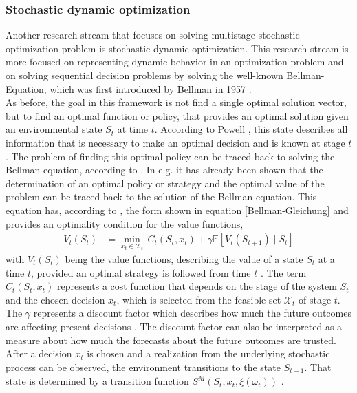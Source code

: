  \subsubsection{Stochastic dynamic optimization} \label{stochastic_dynamic_programming}
Another research stream that focuses on solving multistage stochastic optimization problem is stochastic dynamic optimization.
This research stream is more focused on representing dynamic behavior in an optimization problem and on solving sequential decision problems by solving the well-known Bellman-Equation, which was first introduced by Bellman in 1957 \cite{Bellman1957}. \\
As before, the goal in this framework is not find a single optimal solution vector, but to find an optimal function or policy, that provides an optimal solution given an environmental state $S_t$ at time $t$.
According to Powell \cite{Powell_solving_Curses_of_Dimensionality}, this state describes all information that is necessary to make an optimal decision and is known at stage $t$.
The problem of finding this optimal policy can be traced back to solving the Bellman equation, according to \cite{Einfuehrung_in_das_OR}.
In e.g. \cite{Einfuehrung_in_das_OR} it has already been shown that the determination of an optimal policy or strategy and the optimal value of the problem can be traced back to the solution of the Bellman equation.
This equation has, according to \cite{Powell_solving_Curses_of_Dimensionality}, the form shown in equation \ref{Bellman-Gleichung} and provides an optimality condition for the value functions,
\begin{align}\label{Bellman-Gleichung}
       V_{t}(S_{t})& = \underset{x_{t}\in{\mathcal{X}_{t}}}{\min}\, C_{t}(S_{t},x_{t}) + \gamma \mathbb{E}\left[ V_t(S_{t+1}) \mid S_t \right]
\end{align}
with $V_t(S_t)$ being the value functions, describing the value of a state $S_t$ at a time $t$, provided an optimal strategy is followed from time $t$ \cite{Einfuehrung_in_das_OR}.
The term $C_{t}(S_{t},x_{t})$ represents a cost function that depends on the stage of the system $S_t$ and the chosen decision $x_t$, which is selected from the feasible set $\mathcal{X}_t$ of stage $t$.
The $\gamma$ represents a discount factor which describes how much the future outcomes are affecting present decisions \cite{Einfuehrung_in_das_OR, Powell_solving_Curses_of_Dimensionality}.
The discount factor can also be interpreted as a measure about how much the forecasts about the future outcomes are trusted. \\
After a decision $x_t$ is chosen and a realization from the underlying stochastic process can be observed, the environment transitions to the state $S_{t+1}$.
That state is determined by a transition function $S^M(S_t, x_t, \xi(\omega_t))$ \cite{Powell_solving_Curses_of_Dimensionality}.

